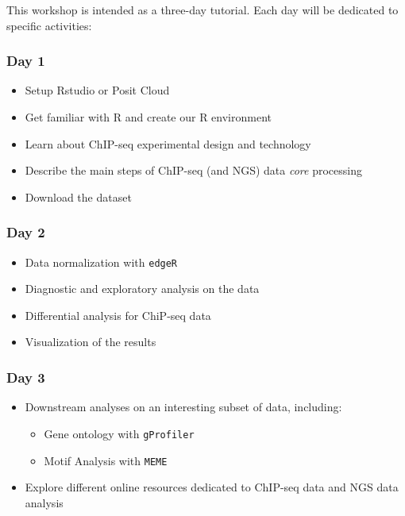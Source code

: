 \documentclass[
]{article}
\providecommand{\tightlist}{%
  \setlength{\itemsep}{0pt}\setlength{\parskip}{0pt}}
\begin{document}
This workshop is intended as a three-day tutorial. Each day will be
dedicated to specific activities:

\hypertarget{day-1}{%
\subsubsection{Day 1}\label{day-1}}

\begin{itemize}
\tightlist
\item
  Setup Rstudio or Posit Cloud
\item
  Get familiar with R and create our R environment
\item
  Learn about ChIP-seq experimental design and technology
\item
  Describe the main steps of ChIP-seq (and NGS) data \emph{core}
  processing
\item
  Download the dataset
\end{itemize}

\hypertarget{day-2}{%
\subsubsection{Day 2}\label{day-2}}

\begin{itemize}
\tightlist
\item
  Data normalization with \texttt{edgeR}
\item
  Diagnostic and exploratory analysis on the data
\item
  Differential analysis for ChiP-seq data
\item
  Visualization of the results
\end{itemize}

\hypertarget{day-3}{%
\subsubsection{Day 3}\label{day-3}}

\begin{itemize}
\tightlist
\item
  Downstream analyses on an interesting subset of data, including:

  \begin{itemize}
  \tightlist
  \item
    Gene ontology with \texttt{gProfiler}
  \item
    Motif Analysis with \texttt{MEME}
  \end{itemize}
\item
  Explore different online resources dedicated to ChIP-seq data and NGS
  data analysis
\end{itemize}
\end{document}
